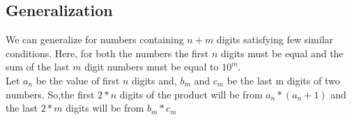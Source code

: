\documentclass{article}
\begin{document}
\subsection{Generalization}
\hspace{3mm} We can generalize for numbers containing $n+m$ digits satisfying few similar conditions. Here, for both
the numbers the first $n$ digits must be equal and the sum of the last $m$ digit numbers must be
equal to $10^m$.\\
\hspace{3mm} Let $a_{n}$ be the value of first $n$ digits and, $b_{m}$ and $c_{m}$ be the last m digits of two numbers. So,the first $2*n$ digits of the product will be from $a_{n}*(a_{n}+1)$ and the last $2*m$ digits will be from $b_{m}*c_{m}$
\end{document}
